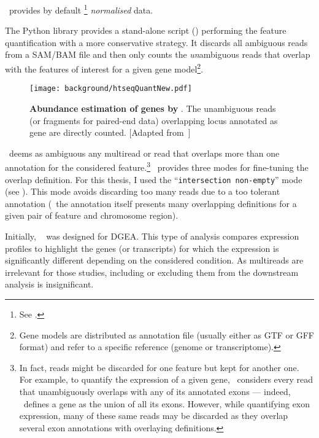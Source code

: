 \cuffl\ provides by default \FPKM\footnote{See .}
\emph{normalised} data.\mybr\

The \gls{Python} library  provides a stand-alone script
(\htseq) performing the feature quantification with a more conservative strategy.
It discards all ambiguous reads from a \gls{SAM}/\gls{BAM} file and then
only counts the \emph{un}ambiguous reads that overlap with the features of
interest for a given gene model\footnote{Gene models are distributed as
annotation file (usually either as \gls{GTF} or \gls{GFF} format) and refer
to a specific reference (genome or transcriptome).}.\mybr\

\begin{figure}
    \texttt{[image: background/htseqQuantNew.pdf]}\centering
    \caption[Abundance estimation of genes by
    HTSeq-count]{\label{fig:htseqEstimation}\textbf{Abundance estimation of genes
    by \htseq}. The unambiguous reads (or fragments for paired-end data)
    overlapping locus annotated as gene are directly counted. [Adapted
    from~\citet{MarPhD}]}
  \end{figure}

\htseq\ deems as ambiguous any multiread or read that overlaps more than
one annotation for the considered feature.\footnote{In fact, reads might be
discarded for one feature but kept for another one. For example, to quantify the
expression of a given gene, \htseq\ considers every read that unambiguously
overlaps with any of its annotated exons --- indeed, \htseq\ defines a gene
as the union of all its exons. However, while quantifying exon expression, many
of these same reads may be discarded as they overlap several exon annotations
with overlaying definitions.}
\htseq\ provides three modes for fine-tuning the overlap definition.
For this thesis, I used the \enquote{\texttt{intersection non-empty}} mode
(see ).
This mode avoids discarding too many reads due to a too tolerant annotation
(\ie\ the annotation itself presents many overlapping definitions for a given
pair of feature and chromosome region).\mybr\

Initially, \htseq~ was designed for \gls{DGEA}.
This type of analysis compares expression profiles
to highlight the genes (or transcripts)
for which the expression is significantly different
depending on the considered condition.
As multireads are irrelevant for those studies,
including or excluding them from the downstream analysis is insignificant.\mybr\

